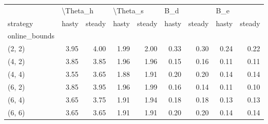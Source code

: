 \begin{tabular}{lrrrrrrrr}
\toprule
{} & \multicolumn{2}{l}{\textbackslash Theta\_h} & \multicolumn{2}{l}{\textbackslash Theta\_s} & \multicolumn{2}{l}{B\_d} & \multicolumn{2}{l}{B\_e} \\
strategy &    hasty & steady &    hasty & steady & hasty & steady & hasty & steady \\
online\_bounds &          &        &          &        &       &        &       &        \\
\midrule
(2, 2)        &     3.95 &   4.00 &     1.99 &   2.00 &  0.33 &   0.30 &  0.24 &   0.22 \\
(4, 2)        &     3.85 &   3.85 &     1.96 &   1.96 &  0.15 &   0.16 &  0.11 &   0.11 \\
(4, 4)        &     3.55 &   3.65 &     1.88 &   1.91 &  0.20 &   0.20 &  0.14 &   0.14 \\
(6, 2)        &     3.85 &   3.95 &     1.96 &   1.99 &  0.16 &   0.14 &  0.11 &   0.10 \\
(6, 4)        &     3.65 &   3.75 &     1.91 &   1.94 &  0.18 &   0.18 &  0.13 &   0.13 \\
(6, 6)        &     3.65 &   3.65 &     1.91 &   1.91 &  0.20 &   0.20 &  0.14 &   0.14 \\
\bottomrule
\end{tabular}
